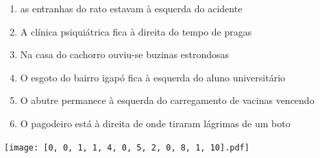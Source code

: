 \documentclass[12pt]{article}
\begin{document}
		 

\pagebreak


	\begin{enumerate}
		  \sffamily %
		  \large %


\vfill \item
as entranhas do rato estavam	%
à esquerda
do acidente	%

\vfill \item
A clínica psiquiátrica fica	%
à direita
do tempo de pragas	%

\vfill \item
Na casa do cachorro	%
ouviu-se buzinas estrondosas	%

\vfill \item
O esgoto do bairro igapó fica	%
à esquerda
do aluno universitário	%

\vfill \item
O abutre permanece	%
à esquerda
do carregamento de vacinas vencendo	%

\vfill \item
O pagodeiro está	%
à direita
de onde tiraram lágrimas de um boto	%
	\end{enumerate}
		  
		  \hfill

		  \vfill

\texttt{[image: [0, 0, 1, 1, 4, 0, 5, 2, 0, 8, 1, 10].pdf]}


	\hfill	  	  


\pagebreak			
\end{document}
